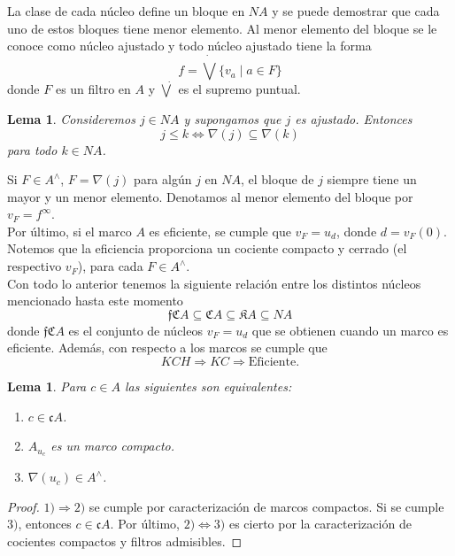 \documentclass[11pt]{amsart}
\theoremstyle{plain}
\newtheorem{lem}[thm]{Lema}
\theoremstyle{definition}
\begin{document}
La clase de cada núcleo define un bloque en $NA$ y se puede demostrar que cada uno de estos bloques tiene menor elemento. Al menor elemento del bloque se le conoce como núcleo ajustado y todo núcleo ajustado tiene la forma
\[
f=\dot\bigvee \{v_a\mid a\in F\}
\]
donde $F$ es un filtro en $A$ y $\dot{\bigvee}$ es el supremo puntual.

\begin{lem}\label{cn ajustado}
    Consideremos $j\in NA$ y supongamos que $j$ es ajustado. Entonces
    \[
    j\leq k\Leftrightarrow \nabla(j)\subseteq \nabla(k)
    \]
    para todo $k\in NA$.
\end{lem}

Si $F\in A^\wedge$, $F=\nabla(j)$ para algún $j$ en $NA$, el bloque de $j$ siempre tiene un mayor y un menor elemento. Denotamos al menor elemento del bloque por  $v_F=f^\infty$.\\

Por último, si el marco $A$ es eficiente, se cumple que $v_F=u_d$, donde $d=v_F(0)$. Notemos que la eficiencia proporciona un cociente compacto y cerrado (el respectivo $v_F$), 
para cada $F\in A^\wedge$.\\

Con todo lo anterior tenemos la siguiente relación entre los distintos núcleos mencionado hasta este momento
\[
\mathfrak{f}\mathfrak{C}A\subseteq \mathfrak{C}A\subseteq \mathfrak{K}A\subseteq NA
\]
donde $\mathfrak{f}\mathfrak{C}A$ es el conjunto de núcleos $v_F=u_d$ que se obtienen cuando un marco es eficiente. Además, con respecto a los marcos se cumple que
\[
KCH\Rightarrow KC\Rightarrow \mbox{Eficiente}.
\]

\begin{lem}\label{Lema2.2}
    Para $c\in A$ las siguientes son equivalentes:
    \begin{enumerate}
        \item $c\in \mathfrak{c}A$.
        \item $A_{u_c}$ es un marco compacto.
        \item $\nabla(u_c)\in A^\wedge$.
    \end{enumerate}
\end{lem}

\begin{proof}
    $1)\Rightarrow 2)$ se cumple por caracterización de marcos compactos. Si se cumple $3)$, entonces $c\in \mathfrak{c}A$. Por último, $2) \Leftrightarrow 3)$ es cierto por la caracterización de cocientes compactos y filtros admisibles. 
\end{proof}
\end{document}
